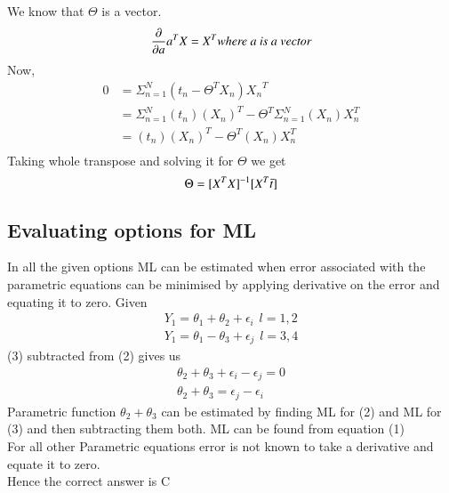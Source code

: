 \documentclass{article}
\begin{document}
We know that $\Theta$ is a vector.
\begin{equation*}
    \frac{\partial}{\partial a} {a^TX} = X^T\\
    \textit{where a is a vector}
\end{equation*}
Now,
\begin{align*}
    0 &= \Sigma_{n=1}^{N} {(t_n - \Theta^T X_n)} {X_n}^T\\
      &= \Sigma_{n=1}^{N} (t_n) (X_n)^T - \Theta^T\Sigma_{n=1}^{N} ( X_n){X_n^T}\\
      &= (t_n) (X_n)^T - \Theta^T ( X_n){X_n^T}\\
\end{align*}
{Taking whole transpose and solving it for $\Theta$ we get}\\
\begin{equation}
    \Theta = [X^TX]^{-1}[X^T\Bar{t}]
\end{equation}


\subsection{Evaluating options for ML}
In all the given options ML can be estimated when error associated with the parametric equations can be minimised by applying derivative on the error and equating it to zero.
Given
\begin{align}
     Y_1 = \theta_1 + \theta_2 + \epsilon_i \hspace{5pt} l = 1,2\\
     Y_1 = \theta_1-\theta_3 + \epsilon_j  \hspace{5pt}  l = 3,4
\end{align}
(3) subtracted from (2) gives us
\begin{align*}
     \theta_2 + \theta_3 + \epsilon_i - \epsilon_j = 0\\
     \theta_2 + \theta_3 = \epsilon_j - \epsilon_i
\end{align*}
Parametric function $\theta_2 + \theta_3$ can be estimated by finding ML for (2) and ML for (3) and then subtracting them both. ML can be found from equation (1)\\
For all other Parametric equations error is not known to take a derivative and equate it to zero.\\
Hence the correct answer is C
\end{document}
